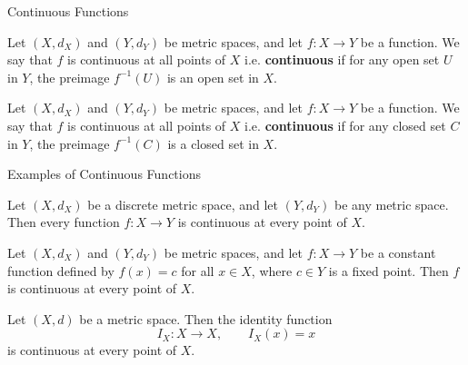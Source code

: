 \documentclass[12pt, a4paper]{article}
\begin{document}
\clearpage

\begin{heading}
    Continuous Functions
\end{heading}

\vspace{10pt}

\begin{definition}
    Let $(X, d_X)$ and $(Y, d_Y)$ be metric spaces, and let $f : X \to Y$ be a function. We say that $f$ is continuous at all points of $X$ i.e. \textbf{continuous} if for any open set $U$ in $Y$, the preimage $f^{-1}(U)$ is an open set in $X$.
\end{definition}

\clearpage

\begin{definition}
    Let $(X, d_X)$ and $(Y, d_Y)$ be metric spaces, and let $f : X \to Y$ be a function. We say that $f$ is continuous at all points of $X$ i.e. \textbf{continuous} if for any closed set $C$ in $Y$, the preimage $f^{-1}(C)$ is a closed set in $X$.
\end{definition}

\clearpage


\begin{heading}
    Examples of Continuous Functions
\end{heading}

\vspace{10pt}

\begin{theorem}
    Let $(X, d_X)$ be a discrete metric space, and let $(Y, d_Y)$ be any metric space. Then every function $f : X \to Y$ is continuous at every point of $X$.
\end{theorem}

\vspace{200pt}

\begin{theorem}
    Let $(X, d_X)$ and $(Y, d_Y)$ be metric spaces, and let $f : X \to Y$ be a constant function defined by $f(x) = c$ for all $x \in X$, where $c \in Y$ is a fixed point. Then $f$ is continuous at every point of $X$.
\end{theorem}

\clearpage

\begin{theorem}
    Let $(X,d)$ be a metric space. Then the identity function
    \[
    I_X : X \to X, \qquad I_X(x)=x
    \]
    is continuous at every point of $X$.
\end{theorem}
\end{document}
